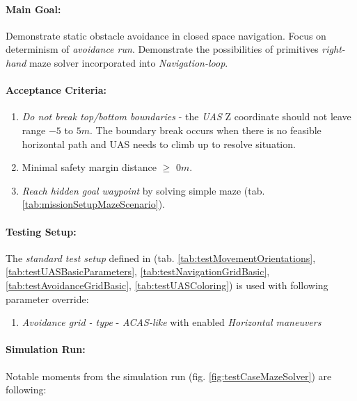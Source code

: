 \paragraph{Main Goal:} Demonstrate static obstacle avoidance in closed space navigation. Focus on determinism of \emph{avoidance run}. Demonstrate the possibilities of primitives \emph{right-hand} maze solver incorporated into \emph{Navigation-loop}.

\paragraph{Acceptance Criteria:}
\begin{enumerate}
    \item \emph{Do not break top/bottom boundaries} - the \emph{UAS} Z coordinate should not leave range $-5$ to $5 m$. The boundary break occurs when there is no feasible horizontal path and UAS needs to climb up to resolve situation.
    
    \item{Minimal safety margin distance} $\ge$ $0m$.
    
    \item\emph{Reach hidden goal waypoint} by solving simple maze (tab. \ref{tab:missionSetupMazeScenario}).
\end{enumerate}

\paragraph{Testing Setup:} The \emph{standard test setup} defined in (tab.  \ref{tab:testMovementOrientations}, \ref{tab:testUASBasicParameters}, \ref{tab:testNavigationGridBasic}, \ref{tab:testAvoidanceGridBasic}, \ref{tab:testUASColoring}) is used with following parameter override:

\begin{enumerate}
    \item \emph{Avoidance grid - type} - \emph{ACAS-like} with enabled \emph{Horizontal maneuvers}
\end{enumerate}

\paragraph{Simulation Run:} Notable moments from  the simulation run (fig. \ref{fig:testCaseMazeSolver}) are following:

